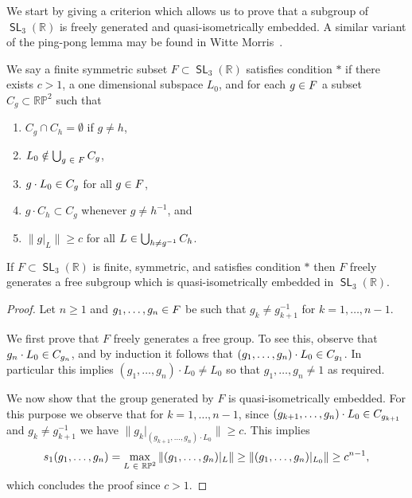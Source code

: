\documentclass[AHL,Unicode,longabstracts]{cedram}
\DeclareMathOperator{\SL}{\mathsf{SL}}
\newcommand{\R}{\mathbb{R}}
\newcommand{\RR}{\R}
\newcommand{\RP}{{\RR\mathbb{P}}}
\let\oldin\in
\renewcommand{\in}{\mathchoice{\oldin}{\oldin}{\,\oldin\,}{\,\oldin\,}}
\newcommand{\RR}{\mathbb{R}}
\begin{document}
We start by giving a criterion which allows us to prove that a subgroup of $\SL_3(\R)$ is freely generated and quasi-isometrically embedded. A similar variant of the ping-pong lemma may be found in Witte Morris~\cite[Lemma~4.9.6]{witte-morris}.



We say a finite symmetric subset $F \subset \SL_3(\R)$ satisfies condition $\ast$ if there exists $c > 1$, a one dimensional subspace $L_0$, and for each $g \in F$ a subset $C_g \subset \RP^2$ such that
\begin{enumerate}
\item $C_g \cap C_h = \emptyset$ if $g \neq h$,
\item $L_0 \notin \bigcup_{g \in F}C_g$,
\item $g\cdot L_0 \in C_g$ for all $g \in F$,
\item $g\cdot C_h \subset C_g$ whenever $g \neq h^{-1}$, and
\item $\|g\vert_L\| \ge c$ for all $L \in \bigcup_{h \neq g^{-1}}C_h$.
\end{enumerate}

\begin{lemm}\label{Lem: pingpong}
If $F \subset \SL_3(\R)$ is finite, symmetric, and satisfies condition $\ast$ then $F$ freely generates a free subgroup which is quasi-isometrically embedded in $\SL_3(\R)$.
\end{lemm}

\begin{proof}
Let $n \ge 1$ and $g_1,\ldots, g_n \in F$ be such that $g_k \neq g_{k+1}^{-1}$ for $k = 1,\ldots, n-1$.

We first prove that $F$ freely generates a free group. To see this, observe that $g_n \cdot L_0 \in C_{g_n}$, and by induction it follows that $(g_1,\dots,g_n) \cdot L_0 \in C_{g_1}$. In particular this implies $(g_1,\dots,g_n)\cdot L_0 \neq L_0$ so that $g_1,\dots,g_n \neq 1$ as required.

We now show that the group generated by $F$ is quasi-isometrically embedded. For this purpose we observe that for $k = 1,\ldots, n-1$, since $(g_{k+1},\dots,g_n)\cdot L_0 \in C_{g_{k+1}}$ and $g_{k} \neq g_{k+1}^{-1}$ we have $\|g_k\vert_{(g_{k+1},\dots,g_n)\cdot L_0}\| \ge c$. This implies
\[
s_1(g_1,\dots,g_n) = \max\limits_{L \in \RP^2}\|(g_1,\dots,g_n)\vert_{ L}\| \ge \|(g_1,\dots,g_n)\vert_{ L_0}\| \ge c^{n-1},
\]
which concludes the proof since $c > 1$.
\end{proof}
\end{document}
